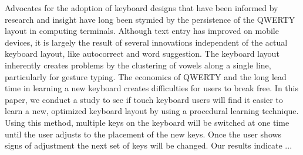 Advocates for the adoption of keyboard designs that have been informed by research and insight have long been stymied by the persistence of the QWERTY layout in computing terminals.  Although text entry has improved on mobile devices, it is largely the result of several innovations independent of the actual keyboard layout, like autocorrect and word suggestion. The keyboard layout inherently creates problems by the clustering of vowels along a single line, particularly for gesture typing. The economics of QWERTY and the long lead time in learning a new keyboard creates difficulties for users to break free. In this paper, we conduct a study to see if touch keyboard users will find it easier to learn a new, optimized keyboard layout by using a procedural learning technique. Using this method, multiple keys on the keyboard will be switched at one time until the user adjusts to the placement of the new keys. Once the user shows signs of adjustment the next set of keys will be changed. Our results indicate ...